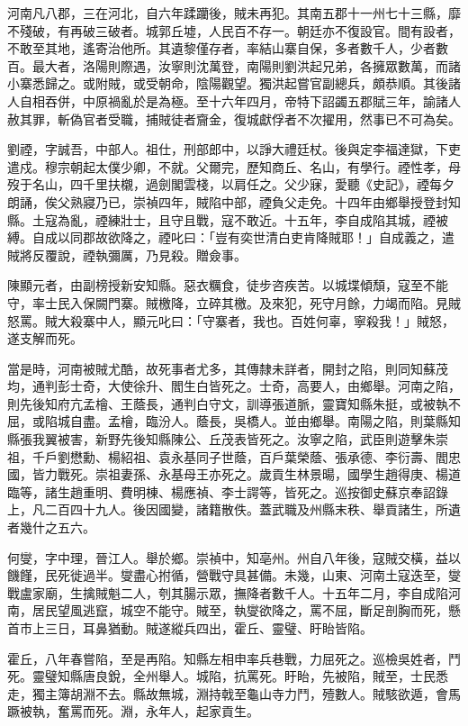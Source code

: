 \begin{pinyinscope}
河南凡八郡，三在河北，自六年蹂躪後，賊未再犯。其南五郡十一州七十三縣，靡不殘破，有再破三破者。城郭丘墟，人民百不存一。朝廷亦不復設官。間有設者，不敢至其地，遙寄治他所。其遺黎僅存者，率結山寨自保，多者數千人，少者數百。最大者，洛陽則際遇，汝寧則沈萬登，南陽則劉洪起兄弟，各擁眾數萬，而諸小寨悉歸之。或附賊，或受朝命，陰陽觀望。獨洪起嘗官副總兵，頗恭順。其後諸人自相吞併，中原禍亂於是為極。至十六年四月，帝特下詔蠲五郡賦三年，諭諸人赦其罪，斬偽官者受職，捕賊徒者齎金，復城獻俘者不次擢用，然事已不可為矣。

劉禋，字誠吾，中部人。祖仕，刑部郎中，以諍大禮廷杖。後與定李福達獄，下吏遣戍。穆宗朝起太僕少卿，不就。父爾完，歷知商丘、名山，有學行。禋性孝，母歿于名山，四千里扶櫬，過劍閣雲棧，以肩任之。父少寐，愛聽《史記》，禋每夕朗誦，俟父熟寢乃已，崇禎四年，賊陷中部，禋負父走免。十四年由鄉舉授登封知縣。土寇為亂，禋練壯士，且守且戰，寇不敢近。十五年，李自成陷其城，禋被縛。自成以同郡故欲降之，禋叱曰：「豈有奕世清白吏肯降賊耶！」自成義之，遣賊將反覆說，禋執彌厲，乃見殺。贈僉事。

陳顯元者，由副榜授新安知縣。惡衣糲食，徒步咨疾苦。以城堞傾頹，寇至不能守，率士民入保闕門寨。賊檄降，立碎其檄。及來犯，死守月餘，力竭而陷。見賊怒罵。賊大殺寨中人，顯元叱曰：「守寨者，我也。百姓何辜，寧殺我！」賊怒，遂支解而死。

當是時，河南被賊尤酷，故死事者尤多，其傳隸未詳者，開封之陷，則同知蘇茂均，通判彭士奇，大使徐升、閻生白皆死之。士奇，高要人，由鄉舉。河南之陷，則先後知府亢孟檜、王蔭長，通判白守文，訓導張道脈，靈寶知縣朱挺，或被執不屈，或陷城自盡。孟檜，臨汾人。蔭長，吳橋人。並由鄉舉。南陽之陷，則葉縣知縣張我翼被害，新野先後知縣陳公、丘茂表皆死之。汝寧之陷，武臣則遊擊朱崇祖，千戶劉懋勳、楊紹祖、袁永基同子世蔭，百戶葉榮蔭、張承德、李衍壽、閻忠國，皆力戰死。崇祖妻孫、永基母王亦死之。歲貢生林景暘，國學生趙得庚、楊道臨等，諸生趙重明、費明棟、楊應禎、李士諤等，皆死之。巡按御史蘇京奉詔錄上，凡二百四十九人。後因國變，諸籍散佚。蓋武職及州縣末秩、舉貢諸生，所遺者幾什之五六。

何燮，字中理，晉江人。舉於鄉。崇禎中，知亳州。州自八年後，寇賊交橫，益以饑饉，民死徙過半。燮盡心拊循，營戰守具甚備。未幾，山東、河南土寇迭至，燮戰盧家廟，生擒賊魁二人，刳其腸示眾，撫降者數千人。十五年二月，李自成陷河南，居民望風逃竄，城空不能守。賊至，執燮欲降之，罵不屈，斷足剖胸而死，懸首市上三日，耳鼻猶動。賊遂縱兵四出，霍丘、靈璧、盱眙皆陷。

霍丘，八年春嘗陷，至是再陷。知縣左相申率兵巷戰，力屈死之。巡檢吳姓者，鬥死。靈璧知縣唐良銳，全州舉人。城陷，抗罵死。盱眙，先被陷，賊至，士民悉走，獨主簿胡淵不去。縣故無城，淵持戟至龜山寺力鬥，殪數人。賊駭欲遁，會馬蹶被執，奮罵而死。淵，永年人，起家貢生。


\end{pinyinscope}
